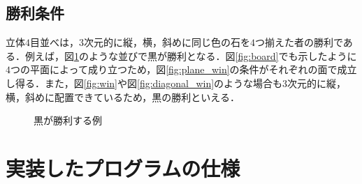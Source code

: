 \documentclass{jarticle}
\begin{document}
\subsection{勝利条件}
立体$4$目並べは，$3$次元的に縦，横，斜めに同じ色の石を$4$つ揃えた者の勝利である．例えば，図\ref{fig:win_example}のような並びで黒が勝利となる．図\ref{fig:board}でも示したように$4$つの平面によって成り立つため，図\ref{fig:plane_win}の条件がそれぞれの面で成立し得る．また，図\ref{fig:win}や図\ref{fig:diagonal_win}のような場合も$3$次元的に縦，横，斜めに配置できているため，黒の勝利といえる．
\begin{figure}[H]
\centering
	\caption{黒が勝利する例}
	\label{fig:win_example}
\end{figure}





\section{実装したプログラムの仕様}
\end{document}

